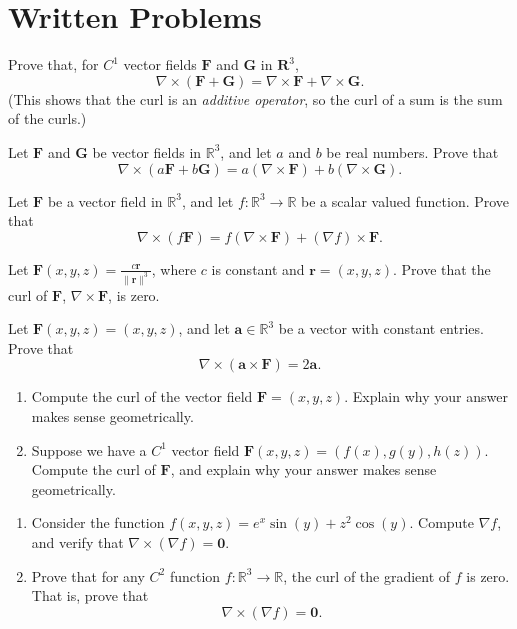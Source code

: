 \documentclass{ximera}
\begin{document}
\section{Written Problems}
\begin{problem}
Prove that, for $C^1$ vector fields $\mathbf{F}$ and $\mathbf{G}$ in $\mathbf{R}^3$,
\[
\nabla \times (\mathbf{F}+\mathbf{G}) = \nabla \times \mathbf{F} + \nabla \times \mathbf{G}.
\]
(This shows that the curl is an \emph{additive operator}, so the curl of a sum is the sum of the curls.)
\end{problem}

\begin{problem}
Let $\mathbf{F}$ and $\mathbf{G}$ be vector fields in $\mathbb{R}^3$, and let $a$ and $b$ be real numbers. Prove that 
\[
\nabla\times(a\mathbf{F}+b\mathbf{G}) = a(\nabla\times\mathbf{F})+b(\nabla\times\mathbf{G}).
\]
\end{problem}

\begin{problem}
Let $\mathbf{F}$ be a vector field in $\mathbb{R}^3$, and let $f:\mathbb{R}^3\rightarrow\mathbb{R}$ be a scalar valued function. Prove that
\[
\nabla\times (f\mathbf{F}) = f(\nabla\times\mathbf{F})+(\nabla f)\times \mathbf{F}.
\]
\end{problem}

\begin{problem}
Let $\mathbf{F}(x,y,z) = \frac{c\mathbf{r}}{\|\mathbf{r}\|^3}$, where $c$ is constant and $\mathbf{r} = (x,y,z)$. Prove that the curl of $\mathbf{F}$, $\nabla\times\mathbf{F}$, is zero.
\end{problem}

\begin{problem}
Let $\mathbf{F}(x,y,z) = (x,y,z)$, and let $\mathbf{a}\in\mathbb{R}^3$ be a vector with constant entries. Prove that 
\[
\nabla\times(\mathbf{a}\times\mathbf{F}) = 2\mathbf{a}.
\]
\end{problem}

\begin{problem}
\begin{enumerate}
\item Compute the curl of the vector field $\mathbf{F} = (x,y,z)$. Explain why your answer makes sense geometrically.
\item Suppose we have a $C^1$ vector field $\mathbf{F}(x,y,z) = (f(x), g(y), h(z))$. Compute the curl of $\mathbf{F}$, and explain why your answer makes sense geometrically.
\end{enumerate}
\end{problem}

\begin{problem}
\begin{enumerate}
\item Consider the function $f(x,y,z) = e^x\sin(y) + z^2\cos(y)$. Compute $\nabla f$, and verify that $\nabla \times(\nabla f) = \mathbf{0}$.
\item Prove that for any $C^2$ function $f:\mathbb{R}^3\rightarrow\mathbb{R}$, the curl of the gradient of $f$ is zero. That is, prove that
\[
\nabla \times(\nabla f) = \mathbf{0}.
\]
\end{enumerate}
\end{problem}
\end{document}
